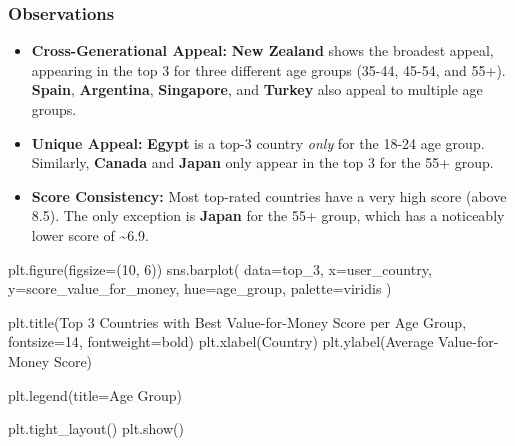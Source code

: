 \documentclass[
  letterpaper,
  DIV=11,
  numbers=noendperiod]{scrartcl}
\newenvironment{Shaded}{\begin{snugshade}}{\end{snugshade}}
\newcommand{\DecValTok}[1]{\textcolor[rgb]{0.68,0.00,0.00}{#1}}
\newcommand{\NormalTok}[1]{\textcolor[rgb]{0.00,0.23,0.31}{#1}}
\newcommand{\OperatorTok}[1]{\textcolor[rgb]{0.37,0.37,0.37}{#1}}
\newcommand{\StringTok}[1]{\textcolor[rgb]{0.13,0.47,0.30}{#1}}
\providecommand{\tightlist}{%
  \setlength{\itemsep}{0pt}\setlength{\parskip}{0pt}}
\begin{document}
\subsubsection{Observations}\label{observations}

\begin{itemize}
\tightlist
\item
  \textbf{Cross-Generational Appeal:} \textbf{New Zealand} shows the
  broadest appeal, appearing in the top 3 for three different age groups
  (35-44, 45-54, and 55+). \textbf{Spain}, \textbf{Argentina},
  \textbf{Singapore}, and \textbf{Turkey} also appeal to multiple age
  groups.
\item
  \textbf{Unique Appeal:} \textbf{Egypt} is a top-3 country \emph{only}
  for the 18-24 age group. Similarly, \textbf{Canada} and \textbf{Japan}
  only appear in the top 3 for the 55+ group.
\item
  \textbf{Score Consistency:} Most top-rated countries have a very high
  score (above 8.5). The only exception is \textbf{Japan} for the 55+
  group, which has a noticeably lower score of \textasciitilde6.9.
\end{itemize}

\begin{Shaded}
\begin{Highlighting}[]
\NormalTok{plt.figure(figsize}\OperatorTok{=}\NormalTok{(}\DecValTok{10}\NormalTok{, }\DecValTok{6}\NormalTok{))}
\NormalTok{sns.barplot(}
\NormalTok{    data}\OperatorTok{=}\NormalTok{top\_3, }
\NormalTok{    x}\OperatorTok{=}\StringTok{\textquotesingle{}user\_country\textquotesingle{}}\NormalTok{, }
\NormalTok{    y}\OperatorTok{=}\StringTok{\textquotesingle{}score\_value\_for\_money\textquotesingle{}}\NormalTok{, }
\NormalTok{    hue}\OperatorTok{=}\StringTok{\textquotesingle{}age\_group\textquotesingle{}}\NormalTok{, }
\NormalTok{    palette}\OperatorTok{=}\StringTok{\textquotesingle{}viridis\textquotesingle{}}
\NormalTok{)}

\NormalTok{plt.title(}\StringTok{\textquotesingle{}Top 3 Countries with Best Value{-}for{-}Money Score per Age Group\textquotesingle{}}\NormalTok{, fontsize}\OperatorTok{=}\DecValTok{14}\NormalTok{, fontweight}\OperatorTok{=}\StringTok{\textquotesingle{}bold\textquotesingle{}}\NormalTok{)}
\NormalTok{plt.xlabel(}\StringTok{\textquotesingle{}Country\textquotesingle{}}\NormalTok{)}
\NormalTok{plt.ylabel(}\StringTok{\textquotesingle{}Average Value{-}for{-}Money Score\textquotesingle{}}\NormalTok{)}

\NormalTok{plt.legend(title}\OperatorTok{=}\StringTok{\textquotesingle{}Age Group\textquotesingle{}}\NormalTok{)}

\NormalTok{plt.tight\_layout()}
\NormalTok{plt.show()}
\end{Highlighting}
\end{Shaded}
\end{document}
